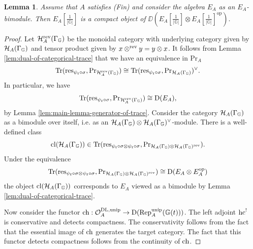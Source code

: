 \documentclass[a4paper, 10pt, oneside, reqno]{amsart}
\theoremstyle{plain}
\newtheorem{lem}[thm]{Lemma}
\theoremstyle{definition}
\theoremstyle{remark}
\newcommand{\Gbb}{\mathbb{G}}
\newcommand{\opp}{\mathrm{op}}
\newcommand{\Prr}{\mathrm{Pr}}
\newcommand{\restr}{\mathrm{res}}
\begin{document}
\begin{lem}\label{lem:compacity-as-a-bimodule}
Assume that $A$ satisfies (Fin) and consider the algebra $E_A$ as an $E_A$-bimodule. Then $E_A[\frac{1}{|\Gbb|}]$ is a compact object of $\DD(E_A[\frac{1}{|\Gbb|}] \otimes E_A[\frac{1}{|\Gbb|}]^{\opp})$. 
\end{lem}

\begin{proof}
Let $\Hcal_{A}^{\rev}(\Gamma_{\Gbb})$ be the monoidal category with underlying category given by $\Hcal_{A}(\Gamma_{\Gbb})$ and tensor product given by $x \otimes^{\mathrm{rev}} y = y \otimes x$. It follows from Lemma \ref{lem:dual-of-categorical-trace} that we have an equivalence in $\Prr_A$
$$\Tr(\restr_{\psi_t \circ \sigma}, \Prr_{\Hcal_{A}^{\rev}(\Gamma_{\Gbb})}) \cong \Tr(\restr_{\psi_t \circ \sigma}, \Prr_{\Hcal_{A}(\Gamma_{\Gbb})})^{\vee}.$$
In particular, we have 
$$\Tr(\restr_{\psi_t \circ \sigma}, \Prr_{\Hcal_{A}^{\rev}(\Gamma_{\Gbb})}) \cong \DD(E_A),$$
by Lemma \ref{lem:main-lemma-generator-of-trace}. 
Consider the category $\Hcal_{A}(\Gamma_{\Gbb})$ as a bimodule over itself, i.e. as an $\Hcal_{A}(\Gamma_{\Gbb}) \otimes \Hcal_{A}(\Gamma_{\Gbb})^{\vee}$-module. There is a well-defined class 
$$\cl(\Hcal_{A}(\Gamma_{\Gbb})) \in \Tr(\restr_{\psi_t \circ \sigma \otimes \psi_t \circ \sigma}, \Prr_{\Hcal_{A}(\Gamma_{\Gbb}) \otimes \Hcal_{A}(\Gamma_{\Gbb})^{\rev}}).$$
Under the equivalence 
$$\Tr(\restr_{\psi_t \circ \sigma \otimes \psi_t \circ \sigma}, \Prr_{\Hcal_{A}(\Gamma_{\Gbb}) \otimes \Hcal_{A}(\Gamma_{\Gbb})^{\rev}}) \cong \DD(E_A \otimes E_A^{\opp})$$
the object $\cl(\Hcal_{A}(\Gamma_{\Gbb}))$ corresponds to $E_A$ viewed as a bimodule by Lemma \ref{lem:dual-of-categorical-trace}. 

Now consider the functor $\ch : \Ocal^{\DL,\unip}_A \to \DD(\Rep_A^{\unip}(\Gbb(t)))$. The left adjoint $\mathrm{hc}^!$ is conservative and detects compactness. The conservativity follows from the fact that the essential image of $\mathrm{ch}$ generates the target category. The fact that this functor detects compactness follows from the continuity of $\mathrm{ch}$. 


\end{proof}
\end{document}
